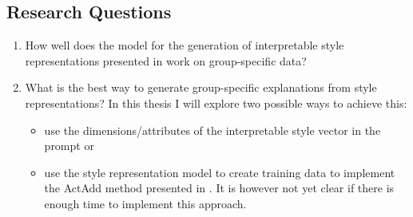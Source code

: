 \subsection{Research Questions}
\begin{enumerate}
  \item How well does the model for the generation of interpretable style representations presented in \citet{patelLearningInterpretableStyle2023} work on group-specific data?
  \item What is the best way to generate group-specific explanations from style representations? \newline
  In this thesis I will explore two possible ways to achieve this:
  \begin{itemize}
    \item use the dimensions/attributes of the interpretable style vector in the prompt or
    \item use the style representation model to create training data to implement the ActAdd method presented in \citet{turnerActivationAdditionSteering2024}. It is however not yet clear if there is enough time to implement this approach.
  \end{itemize}
\end{enumerate}
